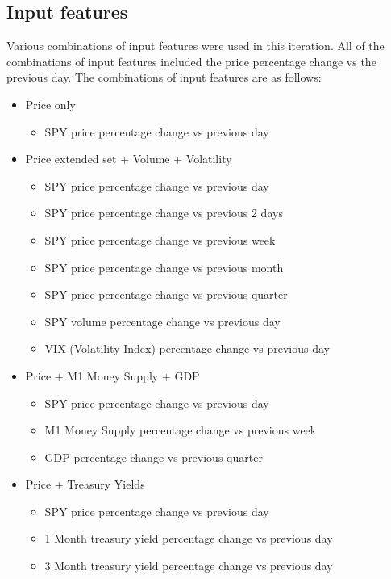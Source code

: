 \subsection{Input features}\label{ssec:iteration5_input_features}
Various combinations of input features were used in this iteration. All of the combinations of input features included the
price percentage change vs the previous day. The combinations of input features are as follows:

\begin{itemize}
    \item Price only
    \begin{itemize}
        \item SPY price percentage change vs previous day
    \end{itemize}
    \item Price extended set + Volume + Volatility
    \begin{itemize}
        \item SPY price percentage change vs previous day
        \item SPY price percentage change vs previous 2 days
        \item SPY price percentage change vs previous week
        \item SPY price percentage change vs previous month
        \item SPY price percentage change vs previous quarter
        \item SPY volume percentage change vs previous day
        \item VIX (Volatility Index) percentage change vs previous day
    \end{itemize}
    \item Price + M1 Money Supply + GDP
    \begin{itemize}
        \item SPY price percentage change vs previous day
        \item M1 Money Supply percentage change vs previous week
        \item GDP percentage change vs previous quarter
    \end{itemize}
    \item Price + Treasury Yields
    \begin{itemize}
        \item SPY price percentage change vs previous day
        \item 1 Month treasury yield percentage change vs previous day
        \item 3 Month treasury yield percentage change vs previous day

\end{itemize}
\end{itemize}
